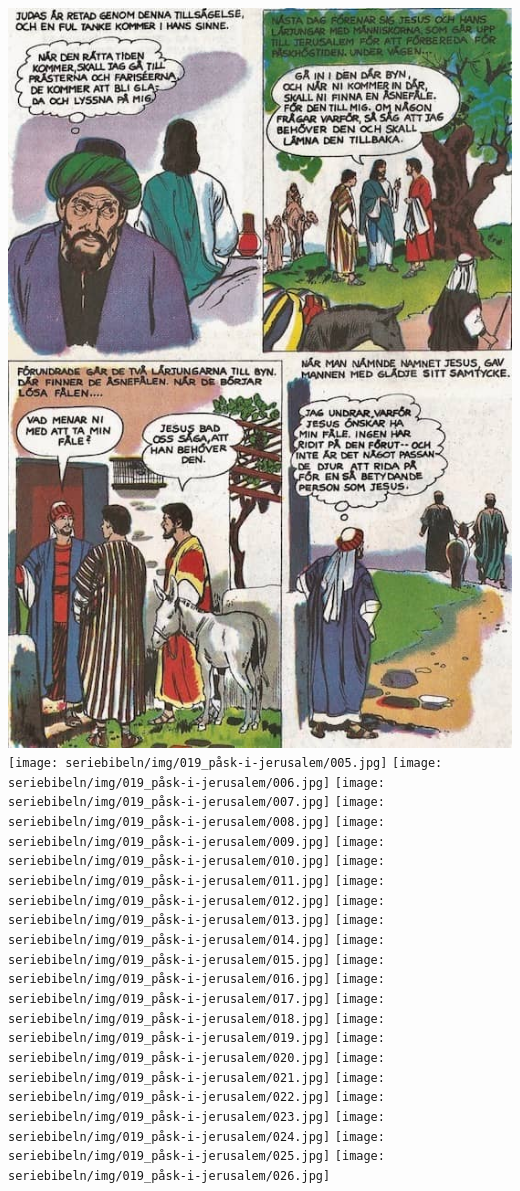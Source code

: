 \includegraphics[width=\textwidth]{seriebibeln/img/018_sackeus/007.jpg}
\texttt{[image: seriebibeln/img/019\_påsk-i-jerusalem/005.jpg]}
\texttt{[image: seriebibeln/img/019\_påsk-i-jerusalem/006.jpg]}
\texttt{[image: seriebibeln/img/019\_påsk-i-jerusalem/007.jpg]}
\texttt{[image: seriebibeln/img/019\_påsk-i-jerusalem/008.jpg]}
\texttt{[image: seriebibeln/img/019\_påsk-i-jerusalem/009.jpg]}
\texttt{[image: seriebibeln/img/019\_påsk-i-jerusalem/010.jpg]}
\texttt{[image: seriebibeln/img/019\_påsk-i-jerusalem/011.jpg]}
\texttt{[image: seriebibeln/img/019\_påsk-i-jerusalem/012.jpg]}
\texttt{[image: seriebibeln/img/019\_påsk-i-jerusalem/013.jpg]}
\texttt{[image: seriebibeln/img/019\_påsk-i-jerusalem/014.jpg]}
\texttt{[image: seriebibeln/img/019\_påsk-i-jerusalem/015.jpg]}
\texttt{[image: seriebibeln/img/019\_påsk-i-jerusalem/016.jpg]}
\texttt{[image: seriebibeln/img/019\_påsk-i-jerusalem/017.jpg]}
\texttt{[image: seriebibeln/img/019\_påsk-i-jerusalem/018.jpg]}
\texttt{[image: seriebibeln/img/019\_påsk-i-jerusalem/019.jpg]}
\texttt{[image: seriebibeln/img/019\_påsk-i-jerusalem/020.jpg]}
\texttt{[image: seriebibeln/img/019\_påsk-i-jerusalem/021.jpg]}
\texttt{[image: seriebibeln/img/019\_påsk-i-jerusalem/022.jpg]}
\texttt{[image: seriebibeln/img/019\_påsk-i-jerusalem/023.jpg]}
\texttt{[image: seriebibeln/img/019\_påsk-i-jerusalem/024.jpg]}
\texttt{[image: seriebibeln/img/019\_påsk-i-jerusalem/025.jpg]}
\texttt{[image: seriebibeln/img/019\_påsk-i-jerusalem/026.jpg]}
